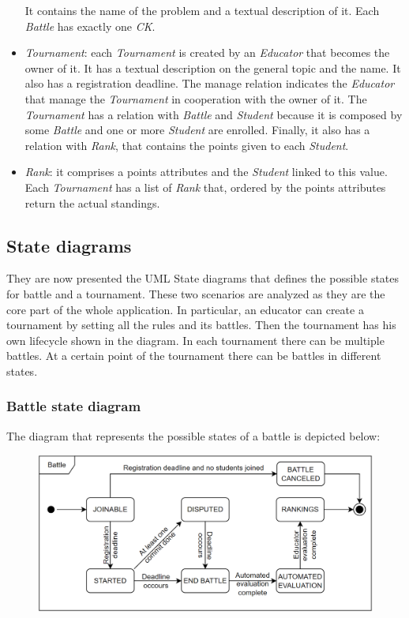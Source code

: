 \documentclass[12pt, a4paper]{report}
\begin{document}
\begin{itemize}
            It contains the name of the problem and a textual description of it. 
            Each \textit{Battle} has exactly one \textit{CK}. 
        \item \textit{Tournament}: each \textit{Tournament} is created by an \textit{Educator} that becomes the owner of it. 
            It has a textual description on the general topic and the name. 
            It also has a registration deadline. 
            The manage relation indicates the \textit{Educator} that manage the \textit{Tournament} in cooperation with the owner of it. 
            The \textit{Tournament} has a relation with \textit{Battle} and \textit{Student} because it is composed by some \textit{Battle} and one or more \textit{Student} are enrolled. 
            Finally, it also has a relation with \textit{Rank}, that contains the points given to each \textit{Student}.
        \item \textit{Rank}: it comprises a points attributes and the \textit{Student} linked to this value. 
            Each \textit{Tournament} has a list of \textit{Rank} that, ordered by the points attributes return the actual standings. 
    \end{itemize}

    \subsection{State diagrams}
    They are now presented the UML State diagrams that defines the possible states for battle and a tournament. 
    These two scenarios are analyzed as they are the core part of the whole application.
    In particular, an educator can create a tournament by setting all the rules and its battles. 
    Then the tournament has his own lifecycle shown in the diagram. 
    In each tournament there can be multiple battles. 
    At a certain point of the tournament there can be battles in different states. 
    
    \subsubsection{Battle state diagram}
    The diagram that represents the possible states of a battle is depicted below: 
    \begin{figure}[H]
        \centering
        \includegraphics[width=0.75\linewidth]{images/battle.png}
    \end{figure}
\end{document}
